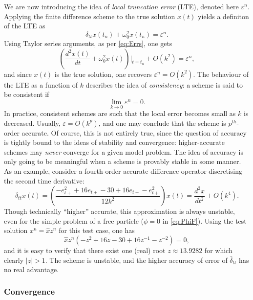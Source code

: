 \documentclass[11pt,twoside,a4paper,english]{book}
\newcommand{\etp}{e_{t+}}
\newcommand{\dtt}{\delta_{tt}}
\begin{document}
We are now introducing the idea of   \emph{local truncation error} (LTE), denoted here $\varepsilon^n$. Applying the finite difference scheme to the true solution $x(t)$ yields a definiton of the LTE as
\begin{equation}\label{eq:LTEdef}
    \dtt x(t_n) + \omega_0^2 x(t_n) = \varepsilon^n.
\end{equation}
Using Taylor series arguments, as per \eqref{eq:Errs}, one gets
\begin{equation}
    \left( \frac{d^2 x(t)}{dt} + \omega_0^2 x(t)\right)|_{t=t_n} + O(k^2) = \varepsilon^n,
\end{equation}
and since $x(t)$ is the true solution, one recovers $\varepsilon^n = O(k^2)$. The behaviour of the LTE as a function of $k$ describes the idea of \emph{consistency}: a scheme is said to be consistent if
\begin{equation}
    \lim_{k\rightarrow 0}\varepsilon^n = 0.
\end{equation}
In practice, consistent schemes are such that the local error becomes small as $k$ is decreased. Usually, $\varepsilon = O(k^p)$, and one may conclude that the scheme is $p^{th}$-order accurate. Of course, this is not entirely true, since the question of accuracy is tightly bound to the ideas of stability and convergence: higher-accurate schemes may \emph{never} converge for a given model problem. The idea of accuracy is only going to be meaningful when a scheme is provably stable in some manner. As an example, consider a fourth-order accurate difference operator discretising the second time derivative:
\begin{equation}\label{eq:FourthOrderdtt}
    \bar\delta_{tt} x(t) = \left(\frac{-\etp^2 + 16 \etp - 30 + 16\etp - \etp^2}{12k^2}\right) x(t) = \frac{d^2 x}{dt^2} + O(k^4).
\end{equation}
Though technically ``higher'' accurate, this approximation is always unstable, even for the simple problem of a free particle ($\phi = 0$ in \eqref{eq:PhiF}). Using the test solution $x^n = \hat x z^n$ for this test case, one has
\begin{equation}
    \hat x z^n \left(-z^2 + 16 z - 30 + 16 z^{-1} - z^{-2}\right) = 0,
\end{equation}
and it is easy to verify that there exist one (real) root $z \approx 13.9282$ for which clearly $|z|>1$. The scheme is unstable, and the higher accuracy of error of $\bar\delta_{tt}$ has no real advantage. 


\subsubsection{Convergence}
\end{document}
